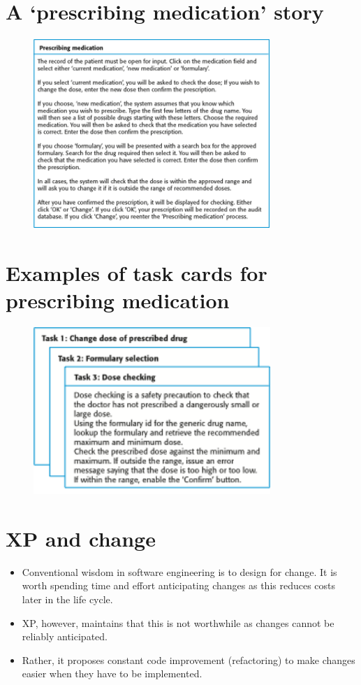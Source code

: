 \section{ A ‘prescribing medication’ story}
\begin{figure}[h!]
    \centering
    \includegraphics[width = 0.8\textwidth]{./figures/L2_4.png}
    \caption{}
    \label{fig:L2_4}
\end{figure}


\section{ Examples of task cards for prescribing medication}
\begin{figure}[h!]
    \centering
    \includegraphics[width = 0.8\textwidth]{./figures/L2_5.png}
    \caption{}
    \label{fig:L2_5}
\end{figure}

\section{ XP and change}
\begin{itemize}
\item Conventional wisdom in software engineering is to design for change. It is worth spending time and effort anticipating changes as this reduces costs later in the life cycle.

\item XP, however, maintains that this is not worthwhile as changes cannot be reliably anticipated.
\item Rather, it proposes constant code improvement (refactoring) to make changes easier when they have to be implemented.
\end{itemize}

